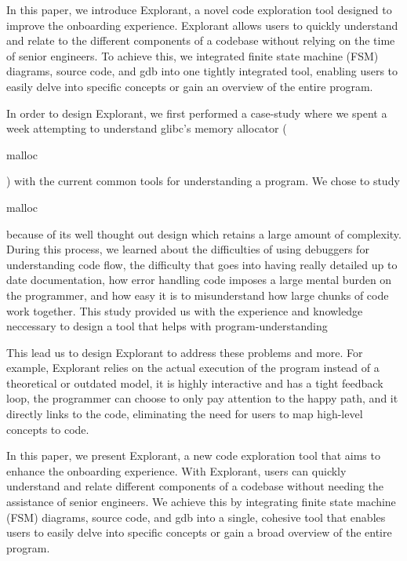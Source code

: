 In this paper, we introduce Explorant, a novel code exploration tool designed to improve the onboarding experience. Explorant allows users to quickly understand and relate to the different components of a codebase without relying on the time of senior engineers. To achieve this, we integrated finite state machine (FSM) diagrams, source code, and gdb into one tightly integrated tool, enabling users to easily delve into specific concepts or gain an overview of the entire program. 

In order to design Explorant, we first performed a case-study where we spent a week attempting to understand glibc's memory allocator (\begin{tt}malloc\end{tt}) with the current common tools for understanding a program. We chose to study \begin{tt}malloc\end{tt} because of its well thought out design which retains a large amount of complexity. During this process, we learned about the difficulties of using debuggers for understanding code flow, the difficulty that goes into having really detailed up to date documentation, how error handling code imposes a large mental burden on the programmer, and how easy it is to misunderstand how large chunks of code work together. This study provided us with the experience and knowledge neccessary to design a tool that helps with program-understanding

This lead us to design Explorant to address these problems and more. For example, Explorant relies on the actual execution of the program instead of a theoretical or outdated model, it is highly interactive and has a tight feedback loop, the programmer can choose to only pay attention to the happy path, and it directly links to the code, eliminating the need for users to map high-level concepts to code. 

In this paper, we present Explorant, a new code exploration tool that aims to enhance the onboarding experience. With Explorant, users can quickly understand and relate different components of a codebase without needing the assistance of senior engineers. We achieve this by integrating finite state machine (FSM) diagrams, source code, and gdb into a single, cohesive tool that enables users to easily delve into specific concepts or gain a broad overview of the entire program.

